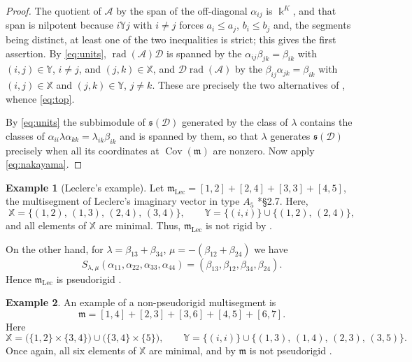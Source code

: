 \documentclass[12pt]{article}
\def\xspace{ }%
\theoremstyle{definition}
\newtheorem{example}[example]{Example}
\newcommand{\prig}{pseudorigid\xspace}
\newcommand{\topp}{\mathfrak{s}}
\newcommand{\Lec}{\mathrm{Lec}}   %
\newcommand{\mm}{\mathfrak{m}}
\newcommand{\kk}{\Bbbk}
\newcommand{\alg}{\mathcal{A}}   %
\newcommand{\bmdl}{\mathcal{D}}   %
\newcommand{\XX}{\mathbb{X}}  %
\newcommand{\YY}{\mathbb{Y}}  %
\newcommand{\Kk}{K}         %
\newcommand{\algbss}{\alpha}     %
\newcommand{\bmdlbss}{\beta}    %
\newcommand{\Sop}{S}
\newcommand{\rad}{\operatorname{rad}}
\newcommand{\Cov}{\operatorname{Cov}}  %
\begin{document}
\begin{proof}
The quotient of $\alg$ by the span of the off-diagonal $\algbss_{ij}$ is
$\kk^{\Kk}$, and that span is nilpotent because $i \YY j$ with $i \ne j$
forces $a_i \le a_j$, $b_i \le b_j$ and, the segments being distinct, at
least one of the two inequalities is strict; this gives the first
assertion. By \eqref{eq:units},
$\rad(\alg)\bmdl$ is spanned by the $\algbss_{ij}\bmdlbss_{jk} =
\bmdlbss_{ik}$ with $(i,j) \in \YY$, $i \ne j$, and $(j,k) \in \XX$, and
$\bmdl\rad(\alg)$ by the $\bmdlbss_{ij}\algbss_{jk} = \bmdlbss_{ik}$ with
$(i,j) \in \XX$ and $(j,k) \in \YY$, $j \ne k$. These are precisely the
two alternatives of , whence \eqref{eq:top}.

By \eqref{eq:units} the subbimodule of $\topp(\bmdl)$ generated by
the class of $\lambda$ contains the classes of $\algbss_{ii}\lambda
\algbss_{kk} = \lambda_{ik}\bmdlbss_{ik}$ and is spanned by them, so that
$\lambda$ generates $\topp(\bmdl)$ precisely when all its coordinates
at $\Cov(\mm)$ are nonzero. Now apply \eqref{eq:nakayama}.
\end{proof}


\begin{example}[Leclerc's example]\label{ex:leclerc}
Let $\mm_{\Lec} = [1,2]+[2,4]+[3,3]+[4,5]$, the multisegment of
Leclerc's imaginary vector in type $A_5$ \cite{MR1959765}*{\S2.7}. Here,
\[
   \XX = \{(1,2),\,(1,3),\,(2,4),\,(3,4)\},
   \qquad
   \YY = \{(i,i)\}\cup\{(1,2),\,(2,4)\},
\]
and all elements of $\XX$ are minimal. Thus, $\mm_{\Lec}$ is not rigid by .

On the other hand, for $\lambda=\bmdlbss_{13}+\bmdlbss_{34}$, $\mu=-(\bmdlbss_{12}+\bmdlbss_{24})$ we have
\[
\Sop_{\lambda,\mu}(\algbss_{11}, \algbss_{22},\algbss_{33},\algbss_{44})=
(\bmdlbss_{13},\bmdlbss_{12},\bmdlbss_{34},\bmdlbss_{24}).
\]
Hence $\mm_{\Lec}$ is \prig.
\end{example}

\begin{example} \label{exma:nonprigid}
An example of a non-\prig multisegment is
\[
   \mm = [1,4]+[2,3]+[3,6]+[4,5]+[6,7] .
\]
Here
\begin{equation}\label{eq:nonprigrel}
   \XX = \bigl(\{1,2\}\times\{3,4\}\bigr) \cup
   \bigl(\{3,4\}\times\{5\}\bigr), \qquad
   \YY = \{(i,i)\}\cup\{(1,3),\,(1,4),\,(2,3),\,(3,5)\}.
\end{equation}
Once again, all six elements of $\XX$ are minimal, and by  $\mm$ is not \prig.
\end{example}
\end{document}
